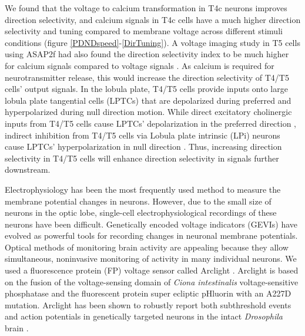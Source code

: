 \documentclass[9pt,lineno]{elife}
\begin{document}
We found that the voltage to calcium transformation in T4c neurons improves direction selectivity, and calcium signals in T4c cells have a much higher direction selectivity and tuning compared to membrane voltage across different stimuli conditions (figure \ref{PDNDspeed}-\ref{DirTuning}). A voltage imaging study in T5 cells using ASAP2f had also found the direction selectivity index to be much higher for calcium signals compared to voltage signals \parencite{Wienecke2018}. As calcium is required for neurotransmitter release, this would increase the direction selectivity of T4/T5 cells' output signals. In the lobula plate, T4/T5 cells provide inputs onto large lobula plate tangential cells (LPTCs) that are depolarized during preferred and hyperpolarized during null direction motion. While direct excitatory cholinergic inputs from T4/T5 cells cause LPTCs' depolarization in the preferred direction \parencite{Mauss2014}, indirect inhibition from T4/T5 cells via Lobula plate intrinsic (LPi) neurons cause LPTCs' hyperpolarization in null direction \parencite{Mauss2015}. Thus, increasing direction selectivity in T4/T5 cells will enhance direction selectivity in signals further downstream. 

Electrophysiology has been the most frequently used method to measure the membrane potential changes in neurons. However, due to the small size of neurons in the optic lobe, single-cell electrophysiological recordings of these neurons have been difficult. Genetically encoded voltage indicators (GEVIs) have evolved as powerful tools for recording changes in neuronal membrane potentials. Optical methods of monitoring brain activity are appealing because they allow simultaneous, noninvasive monitoring of activity in many individual neurons. We used a fluorescence protein (FP) voltage sensor called Arclight \parencite{Jin2012}. Arclight is based on the fusion of the voltage-sensing domain of \textit{Ciona intestinalis} voltage-sensitive phosphatase \parencite{Murata2005} and the fluorescent protein super ecliptic pHluorin with an A227D mutation. Arclight has been shown to robustly report both subthreshold events and action potentials in genetically targeted neurons in the intact \textit{Drosophila} brain \parencite{Cao2013}. 
\end{document}
